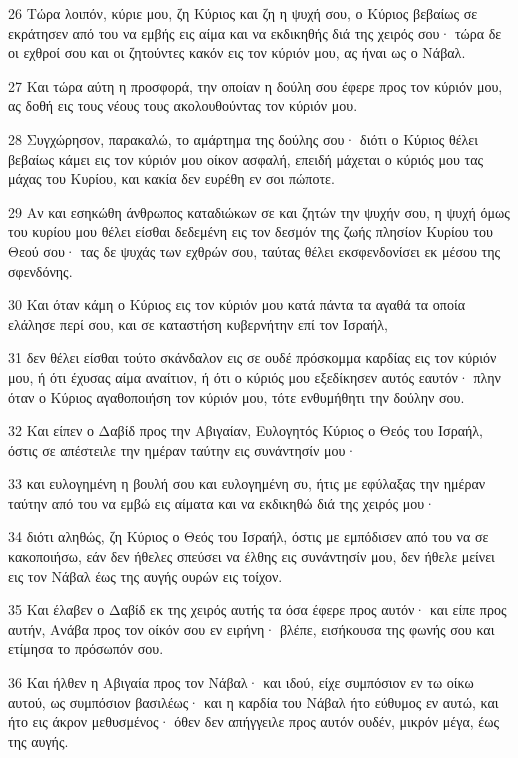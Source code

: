 \par 26 Τώρα λοιπόν, κύριε μου, ζη Κύριος και ζη η ψυχή σου, ο Κύριος βεβαίως σε εκράτησεν από του να εμβής εις αίμα και να εκδικηθής διά της χειρός σου· τώρα δε οι εχθροί σου και οι ζητούντες κακόν εις τον κύριόν μου, ας ήναι ως ο Νάβαλ.
\par 27 Και τώρα αύτη η προσφορά, την οποίαν η δούλη σου έφερε προς τον κύριόν μου, ας δοθή εις τους νέους τους ακολουθούντας τον κύριόν μου.
\par 28 Συγχώρησον, παρακαλώ, το αμάρτημα της δούλης σου· διότι ο Κύριος θέλει βεβαίως κάμει εις τον κύριόν μου οίκον ασφαλή, επειδή μάχεται ο κύριός μου τας μάχας του Κυρίου, και κακία δεν ευρέθη εν σοι πώποτε.
\par 29 Αν και εσηκώθη άνθρωπος καταδιώκων σε και ζητών την ψυχήν σου, η ψυχή όμως του κυρίου μου θέλει είσθαι δεδεμένη εις τον δεσμόν της ζωής πλησίον Κυρίου του Θεού σου· τας δε ψυχάς των εχθρών σου, ταύτας θέλει εκσφενδονίσει εκ μέσου της σφενδόνης.
\par 30 Και όταν κάμη ο Κύριος εις τον κύριόν μου κατά πάντα τα αγαθά τα οποία ελάλησε περί σου, και σε καταστήση κυβερνήτην επί τον Ισραήλ,
\par 31 δεν θέλει είσθαι τούτο σκάνδαλον εις σε ουδέ πρόσκομμα καρδίας εις τον κύριόν μου, ή ότι έχυσας αίμα αναίτιον, ή ότι ο κύριός μου εξεδίκησεν αυτός εαυτόν· πλην όταν ο Κύριος αγαθοποιήση τον κύριόν μου, τότε ενθυμήθητι την δούλην σου.
\par 32 Και είπεν ο Δαβίδ προς την Αβιγαίαν, Ευλογητός Κύριος ο Θεός του Ισραήλ, όστις σε απέστειλε την ημέραν ταύτην εις συνάντησίν μου·
\par 33 και ευλογημένη η βουλή σου και ευλογημένη συ, ήτις με εφύλαξας την ημέραν ταύτην από του να εμβώ εις αίματα και να εκδικηθώ διά της χειρός μου·
\par 34 διότι αληθώς, ζη Κύριος ο Θεός του Ισραήλ, όστις με εμπόδισεν από του να σε κακοποιήσω, εάν δεν ήθελες σπεύσει να έλθης εις συνάντησίν μου, δεν ήθελε μείνει εις τον Νάβαλ έως της αυγής ουρών εις τοίχον.
\par 35 Και έλαβεν ο Δαβίδ εκ της χειρός αυτής τα όσα έφερε προς αυτόν· και είπε προς αυτήν, Ανάβα προς τον οίκόν σου εν ειρήνη· βλέπε, εισήκουσα της φωνής σου και ετίμησα το πρόσωπόν σου.
\par 36 Και ήλθεν η Αβιγαία προς τον Νάβαλ· και ιδού, είχε συμπόσιον εν τω οίκω αυτού, ως συμπόσιον βασιλέως· και η καρδία του Νάβαλ ήτο εύθυμος εν αυτώ, και ήτο εις άκρον μεθυσμένος· όθεν δεν απήγγειλε προς αυτόν ουδέν, μικρόν μέγα, έως της αυγής.
